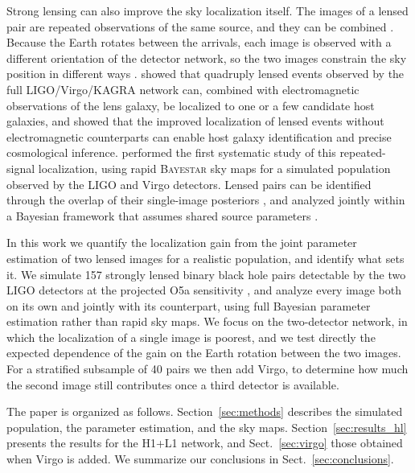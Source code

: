 \documentclass{aa}
\begin{document}
Strong lensing can also improve the sky localization itself. The images of
a lensed pair are repeated observations of the same source, and they can be
combined \citep{hubble_constant_lensing,Chen_2025}. Because the Earth
rotates between the arrivals, each image is observed with a different
orientation of the detector network, so the two images constrain the sky
position in different ways \citep{Hannuksela_skyloc}.
\citet{hubble_constant_lensing} showed that quadruply lensed events observed
by the full LIGO/Virgo/KAGRA network can, combined with electromagnetic
observations of the lens galaxy, be localized to one or a few candidate
host galaxies, and \citet{Chen_2025} showed that the improved localization
of lensed events without electromagnetic counterparts can enable host
galaxy identification and precise cosmological inference.
\citet{Hannuksela_skyloc} performed the first systematic study of this
repeated-signal localization, using rapid \textsc{Bayestar} sky maps
\citep{SingerPrice2016} for a simulated population observed by the LIGO and
Virgo detectors. Lensed pairs can be identified through the overlap of their
single-image posteriors \citep{Haris2018}, and analyzed jointly within a
Bayesian framework that assumes shared source parameters
\citep{PE_lensing_bayes}.

In this work we quantify the localization gain from the joint parameter
estimation of two lensed images for a realistic population, and identify
what sets it. We simulate 157 strongly lensed binary black hole pairs
detectable by the two LIGO detectors at the projected O5a sensitivity
\citep{O5PSD}, and analyze every image both on its own and jointly with its
counterpart, using full Bayesian parameter estimation rather than rapid
sky maps. We focus on the two-detector network, in which the localization
of a single image is poorest, and we test directly the expected dependence
of the gain on the Earth rotation between the two images. For a stratified
subsample of 40 pairs we then add Virgo, to determine how much the second
image still contributes once a third detector is available.

The paper is organized as follows. Section~\ref{sec:methods} describes the
simulated population, the parameter estimation, and the sky maps.
Section~\ref{sec:results_hl} presents the results for the H1+L1 network,
and Sect.~\ref{sec:virgo} those obtained when Virgo is added. We summarize
our conclusions in Sect.~\ref{sec:conclusions}.
\iffalse
\end{document}
